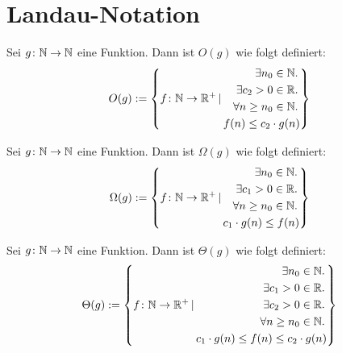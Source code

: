 \section{Landau-Notation}

\begin{definition}
	Sei $g \colon \mathbb{N} \rightarrow \mathbb{N}$ eine Funktion. Dann ist $O(g)$
	wie folgt definiert:
	\begin{equation}
		O(g) := 
		\left\{
			f \colon \mathbb{N} \rightarrow \mathbb{R}^+ \,|\,
			\begin{aligned}
				\exists n_0 \in \mathbb{N}.\, \\
				\exists c_2 > 0 \in \mathbb{R}.\, \\
				\forall n \geq n_0 \in \mathbb{N}.\, \\
				f(n) \leq c_2 \cdot g(n) \\
			\end{aligned}
		\right\}
	\end{equation}
\end{definition}

\begin{definition}
	Sei $g \colon \mathbb{N} \rightarrow \mathbb{N}$ eine Funktion. Dann ist $\Omega(g)$
	wie folgt definiert:
	\begin{equation}
		\Omega(g) := 
		\left\{
			f \colon \mathbb{N} \rightarrow \mathbb{R}^+ \,|\, 
			\begin{aligned}
			\exists n_0 \in \mathbb{N}.\, \\
			\exists c_1 > 0 \in \mathbb{R}.\, \\
			\forall n \geq n_0 \in \mathbb{N}.\, \\
			c_1 \cdot g(n) \leq f(n) \\
			\end{aligned}
		\right\}
	\end{equation}
\end{definition}

\begin{definition}
	Sei $g \colon \mathbb{N} \rightarrow \mathbb{N}$ eine Funktion. Dann ist $\Theta(g)$
	wie folgt definiert:
	\begin{equation}
		\Theta(g) := 
		\left\{
			f \colon \mathbb{N} \rightarrow \mathbb{R}^+ \,|\, 
			\begin{aligned}
			\exists n_0 \in \mathbb{N}.\, \\
			\exists c_1 > 0 \in \mathbb{R}.\, \\
			\exists c_2 > 0 \in \mathbb{R}.\, \\
			\forall n \geq n_0 \in \mathbb{N}.\, \\
			c_1 \cdot g(n) \leq f(n) \leq c_2 \cdot g(n) \\
			\end{aligned}
		\right\}
	\end{equation}
\end{definition}

